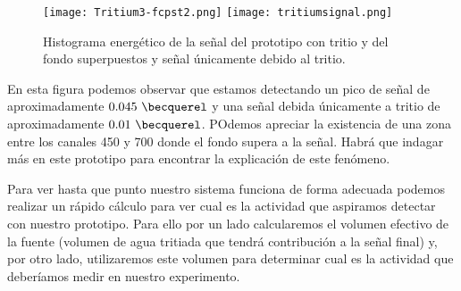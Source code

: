 \begin{figure}[htb]
\centering
{
\texttt{[image: Tritium3-fcpst2.png]} 
}
{
\texttt{[image: tritiumsignal.png]} 
}
\caption{Histograma energético de la señal del prototipo con tritio y del fondo superpuestos y señal únicamente debido al tritio.\label{tritiofondo}}
\end{figure}


En esta figura podemos observar que estamos detectando un pico de señal de aproximadamente $0.045~\becquerel$ y una señal debida únicamente a tritio de aproximadamente $0.01~\becquerel$. POdemos apreciar la existencia de una zona entre los canales 450 y 700 donde el fondo supera a la señal. Habrá que indagar más en este prototipo para encontrar la explicación de este fenómeno.

Para ver hasta que punto nuestro sistema funciona de forma adecuada podemos realizar un rápido cálculo para ver cual es la actividad que aspiramos detectar con nuestro prototipo. Para ello por un lado calcularemos el volumen efectivo de la fuente (volumen de agua tritiada que tendrá contribución a la señal final) y, por otro lado, utilizaremos este volumen para determinar cual es la actividad que deberíamos medir en nuestro experimento.

